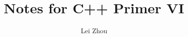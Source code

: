 \documentclass{article}
\begin{document}
\title{Notes for C++ Primer VI}
\author{Lei Zhou}
\maketitle

%

%

%

%

%

%
\end{document}
